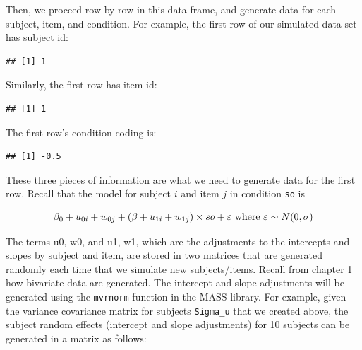 \documentclass[12pt,]{krantz}
\newenvironment{Shaded}{\begin{snugshade}}{\end{snugshade}}
\newcommand{\DecValTok}[1]{\textcolor[rgb]{0.00,0.00,0.81}{#1}}
\newcommand{\NormalTok}[1]{#1}
\newcommand{\OperatorTok}[1]{\textcolor[rgb]{0.81,0.36,0.00}{\textbf{#1}}}
\begin{document}
Then, we proceed row-by-row in this data frame, and generate data for each subject, item, and condition. For example, the first row of our simulated data-set has subject id:

\begin{Shaded}
\end{Shaded}

\begin{verbatim}
## [1] 1
\end{verbatim}

Similarly, the first row has item id:

\begin{Shaded}
\end{Shaded}

\begin{verbatim}
## [1] 1
\end{verbatim}

The first row's condition coding is:

\begin{Shaded}
\end{Shaded}

\begin{verbatim}
## [1] -0.5
\end{verbatim}

These three pieces of information are what we need to generate data for the first row. Recall that the model for subject \(i\) and item \(j\) in condition \texttt{so} is

\begin{equation}
\beta_0 + u_{0i} + w_{0j} + (\beta + u_{1i} + w_{1j})\times so + \varepsilon \hbox{ where } \varepsilon \sim N(0,\sigma)
\end{equation}

The terms u0, w0, and u1, w1, which are the adjustments to the intercepts and slopes by subject and item, are stored in two matrices that are generated randomly each time that we simulate new subjects/items. Recall from chapter 1 how bivariate data are generated. The intercept and slope adjustments will be generated using the \texttt{mvrnorm} function in the MASS library. For example, given the variance covariance matrix for subjects \texttt{Sigma\_u} that we created above, the subject random effects (intercept and slope adjustments) for 10 subjects can be generated in a matrix as follows:
\end{document}
